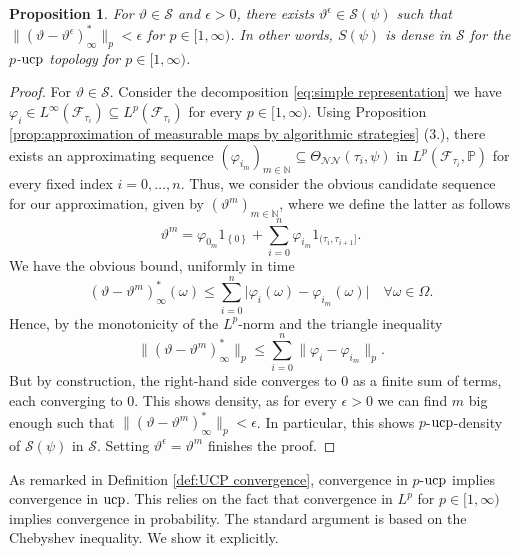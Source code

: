 \documentclass[11pt,a4paper,twoside,openany]{report}
\numberwithin{equation}{section}
\theoremstyle{plain} %
\newtheorem{proposition}[theorem]{Proposition}
\theoremstyle{definition} %
\theoremstyle{remark} %
\begin{document}
\begin{proposition}\label{prop:p-UCP density of S}
    For \(\vartheta\in\mathcal{S}\) and \(\epsilon>0\), there exists \(\vartheta^{\epsilon}\in\mathcal{S}(\psi)\) such that \(\lVert(\vartheta-\vartheta^{\epsilon})_{\infty}^*\rVert_p<\epsilon\) for \(p\in[1,\infty)\). In other words, \(S(\psi)\) is dense in \(\mathcal{S}\) for the \(p\)-\(\rm{ucp}\) topology for \(p\in[1,\infty)\).
\end{proposition}
\begin{proof}
For \(\vartheta\in\mathcal{S}\). Consider the decomposition \eqref{eq:simple representation} we have \(\varphi_i\in L^{\infty}(\mathcal{F}_{\tau_i})\subseteq L^p(\mathcal{F}_{\tau_i})\) for every \(p\in[1,\infty)\). Using Proposition \ref{prop:approximation of measurable maps by algorithmic strategies} (3.), there exists an approximating sequence \((\varphi_i_m)_{m\in\mathbb{N}}\subseteq\Theta_{\mathcal{NN}}(\tau_i,\psi)\) in \(L^p(\mathcal{F}_{\tau_i},\mathbb{P})\) for every fixed index \(i=0,\dots,n\). Thus, we consider the obvious candidate sequence for our approximation, given by \((\vartheta^m)_{m\in\mathbb{N}}\), where we define the latter as follows
\begin{equation*}
    \vartheta^m = \varphi_0_m1_{\left\{0\right\}}+\sum_{i=0}^n\varphi_i_m1_{(\tau_i,\tau_{i+1}]}.
\end{equation*}
We have the obvious bound, uniformly in time
\begin{equation*}
   (\vartheta-\vartheta^m)_{\infty}^*(\omega)\leq \sum_{i=0}^n\big|\varphi_i(\omega)-\varphi_i_m(\omega)\big|\quad\forall\omega\in\Omega.
\end{equation*}
Hence, by the monotonicity of the \(L^p\)-norm and the triangle inequality
\begin{equation*}
    \lVert (\vartheta-\vartheta^m)_{\infty}^*\rVert_{p}\leq\sum_{i=0}^n\lVert \varphi_i-\varphi_i_m\rVert_p.
\end{equation*}
But by construction, the right-hand side converges to \(0\) as a finite sum of terms, each converging to \(0\). This shows density, as for every \(\epsilon>0\) we can find \(m\) big enough such that \(\lVert (\vartheta-\vartheta^m)_{\infty}^*\rVert_{p}<\epsilon\). In particular, this shows \(p\)-\(\rm{ucp}\)-density of \(\mathcal{S}(\psi)\) in \(\mathcal{S}\). Setting \(\vartheta^{\epsilon}=\vartheta^m\) finishes the proof.
\end{proof}
As remarked in Definition \ref{def:UCP convergence}, convergence in \(p\)-\(\rm{ucp}\) implies convergence in \(\rm{ucp}\). This relies on the fact that convergence in \(L^p\) for \(p\in[1,\infty)\) implies convergence in probability. The standard argument is based on the Chebyshev inequality. We show it explicitly. 
\end{document}
